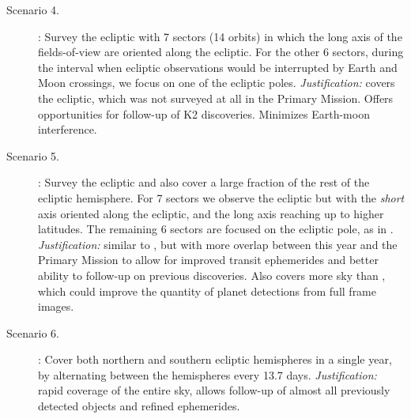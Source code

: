\begin{description}
\item[Scenario 4.] \elong: Survey the ecliptic with 7 sectors (14
  orbits) in which the long axis of the fields-of-view are oriented
  along the ecliptic.  For the other 6 sectors, during the interval
  when ecliptic observations would be interrupted by Earth and Moon
  crossings, we focus on one of the ecliptic poles.
  \textit{Justification:} covers the ecliptic, which was not surveyed
  at all in the Primary Mission.  Offers opportunities for follow-up
  of K2 discoveries. Minimizes Earth-moon interference.
  
\item[Scenario 5.] \eshort: Survey the ecliptic and also cover a large
  fraction of the rest of the ecliptic hemisphere. For 7 sectors we
  observe the ecliptic but with the {\it short} axis oriented along
  the ecliptic, and the long axis reaching up to higher latitudes.
  The remaining 6 sectors are focused on the ecliptic pole, as in
  \elong.  \textit{Justification:} similar to \elong, but with more
  overlap between this year and the Primary Mission to allow for
  improved transit ephemerides and better ability to follow-up on
  previous discoveries.
  Also covers more sky than \elong, which could improve the quantity
  of planet detections from full frame images.
  
\item[Scenario 6.] \hemis: Cover both northern and southern ecliptic
  hemispheres in a single year, by alternating between the hemispheres
  every 13.7 days.  \textit{Justification:} rapid coverage of the
  entire sky, allows follow-up of almost all previously detected \tess
  objects and refined ephemerides.

\end{description}

